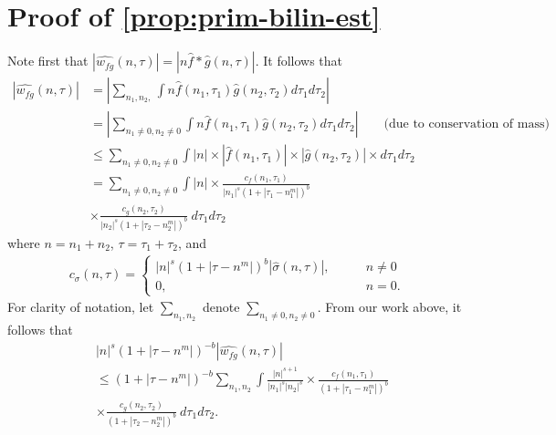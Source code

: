 \documentclass[12pt,reqno]{amsart}
\numberwithin{equation}{section}  %
\numberwithin{figure}{section}
\newcommand{\wh}{\widehat}
\theoremstyle{plain}
\theoremstyle{definition}
\theoremstyle{remark}
\begin{document}
\section{ Proof of \autoref{prop:prim-bilin-est}}
Note first that $|\wh{w_{fg}}(n, \tau) |  = | n\wh{f} *  \wh{g} 
(n, \tau)|$. It follows that
%
%
\begin{equation}
	\label{non-lin-rep}
	\begin{split}
		| \wh{w_{fg}}(n, \tau)|
		& = | \sum_{n_1, n_2,}  \int n\wh{f}\left( n_1,  \tau_1 
\right) \wh{g}\left( n_2, \tau_2  
\right) d \tau_1 d \tau_2 |
\\
& = | \sum_{n_1 \neq 0, n_2 \neq 0}  \int n\wh{f}\left( n_1,  \tau_1 
\right) \wh{g}\left( n_2, \tau_2  
\right) d \tau_1 d \tau_2 | \qquad \text{(due to conservation of mass)}
\\
& \le \sum_{n_1 \neq 0, n_2 \neq 0}   \int | n | \times | \wh{f}\left( n_1, \tau_1 
\right) | \times  | \wh{g}\left( n_2, \tau_2 
\right) | \times  d \tau_1 d \tau_2  
\\
& = \sum_{n_1 \neq 0, n_2 \neq 0} \int | n | \times \frac{c_f\left( n_1, \tau_1 
\right)}{|n_1|^s \left( 1 + | \tau_1 - n_1^{m} | \right)^{b}}
\\
& \times \frac{c_{g}\left( n_2, \tau_2 \right)}{|n_2|^s\left( 1 + | \tau_2 -  n_2^{m }| 
\right)^{b}}
  \ d \tau_1 d \tau_2 
\end{split}
\end{equation}
%
%
where $n = n_1 + n_2$, $\tau = \tau_1 + \tau_2$, and 
%
%
\begin{equation*}
	\begin{split}
		c_\sigma(n, \tau) =
		\begin{cases}
			|n|^s \left( 1 + | \tau - n^{m } |  
		\right)^{b} | \wh{\sigma}\left( n, \tau \right) |, \qquad & n \neq 0
		\\
		0, \qquad & n = 0.
	\end{cases}
	\end{split}
\end{equation*}
%
%
For clarity of notation, let  $\sum_{n_1, n_2}$ denote $\sum_{n_1 \neq 0, n_2
\neq 0}$. From our work above, it follows that 
%
%
\begin{equation}
	\label{convo-est-starting-pnt}
	\begin{split}
		 & |n|^s \left( 1 + | \tau - n^{m } | \right)^{-b} | \wh{w_{fg}}\left( 
		n, \tau \right) |
		\\
		& \le \left( 1 + | \tau - n^{m } | \right)^{-b}
		\sum_{n_1, n_2} \int \frac{|n|^{s+1}}{|n_1|^s | n_2|^s} 
		\times \frac{c_f(n_1, \tau_1)}{\left( 1 + | \tau_1 - n_1^{m } | 
		\right)^{b}}
		\\
		& \times
		\frac{c_g(n_2, \tau_2)}{\left( 1 + | \tau_2 - n_2^{m } | 
		\right)^{b}}\ d \tau_1 d \tau_2.
	\end{split}
\end{equation}
\end{document}
